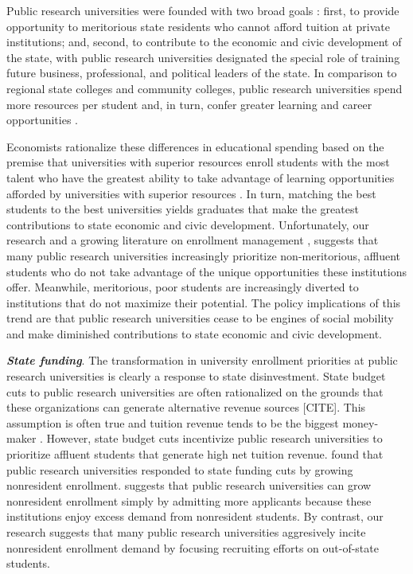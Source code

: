\documentclass[twoside]{article}
\begin{document}
Public research universities were founded with two broad goals \citep{RN2269,RN1149}: first, to provide opportunity to meritorious state residents who cannot afford tuition at private institutions; and, second, to contribute to the economic and civic development of the state, with public research universities designated the special role of training future business, professional, and political leaders of the state.  In comparison to regional state colleges and community colleges, public research universities spend more resources per student and, in turn, confer greater learning and career opportunities \citep{RN1545}. 

Economists rationalize these differences in educational spending based on the premise that universities with superior resources enroll students with the most talent who have the greatest ability to take advantage of learning opportunities afforded by universities with superior resources \citep{RN1549,RN2247,RN2402}. In turn, matching the best students to the best universities yields graduates that make the greatest contributions to state economic and civic development.  Unfortunately, our research and a growing literature on enrollment management \citep[e.g., ][]{RN3685,RN3528,RN4409,RN4032}, suggests that many public research universities increasingly prioritize non-meritorious, affluent students who do not take advantage of the unique opportunities these institutions offer. Meanwhile, meritorious, poor students are increasingly diverted to institutions that do not maximize their potential. The policy implications of this trend are that public research universities cease to be engines of social mobility and make diminished contributions to state economic and civic development.

\textbf{\textit{State funding}}. The transformation in university enrollment priorities at public research universities is clearly a response to state disinvestment.  State budget cuts to public research universities are often rationalized on the grounds that these organizations can generate alternative revenue sources [CITE]. This assumption is often true and tuition revenue tends to be the biggest money-maker \citep{RN4247}. However, state budget cuts incentivize public research universities to prioritize affluent students that generate high net tuition revenue.  \cite{RN3753} found that public research universities responded to state funding cuts by growing nonresident enrollment. \cite{RN2535} suggests that public research universities can grow nonresident enrollment simply by admitting more applicants because these institutions enjoy excess demand from nonresident students. By contrast, our research suggests that many public research universities aggresively incite nonresident enrollment demand by focusing recruiting efforts on out-of-state students.
\end{document}
